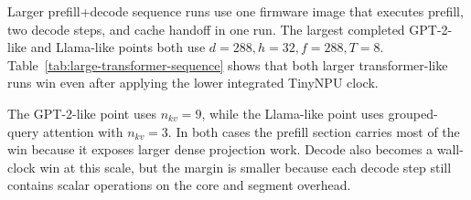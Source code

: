 \documentclass[a4paper, 12pt, titlepage]{article}
\begin{document}
Larger prefill+decode sequence runs use one firmware image that executes prefill, two decode steps, and cache handoff in one run. The largest completed GPT-2-like and Llama-like points both use \(d=288,h=32,f=288,T=8\). Table~\ref{tab:large-transformer-sequence} shows that both larger transformer-like runs win even after applying the lower integrated TinyNPU clock.

\begin{table}[H]
    \centering
    \footnotesize
    \caption{Large transformer-like prefill+decode+decode sequences using the routed timing assumptions from Table~\ref{tab:vivado-timing}.}
    \label{tab:large-transformer-sequence}
\end{table}

The GPT-2-like point uses \(n_{kv}=9\), while the Llama-like point uses grouped-query attention with \(n_{kv}=3\). In both cases the prefill section carries most of the win because it exposes larger dense projection work. Decode also becomes a wall-clock win at this scale, but the margin is smaller because each decode step still contains scalar operations on the core and segment overhead.
\end{document}
